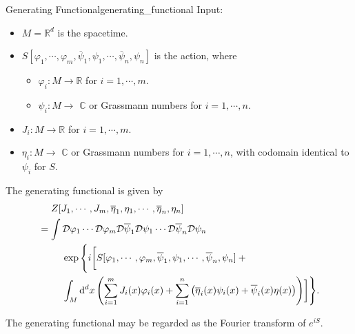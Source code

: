 \documentclass{article}
\begin{document}
\begin{definition}{Generating Functional}{generating_functional}
    Input:
    \begin{itemize}[nosep]
        \item $M = \mathbb{R}^{d}$ is the spacetime.
        \item $S[\varphi_1, \cdots, \varphi_m, \overline{\psi}_1,\psi_1,\cdots,\overline{\psi}_n,\psi_n]$ is the action, where
        \begin{itemize}[nosep]
            \item $\varphi_i: M \rightarrow \mathbb{R}$ for $i = 1,\cdots,m$.
            \item $\psi_i: M \rightarrow$ $\mathbb{C}$ or Grassmann numbers for $i = 1,\cdots, n$.
        \end{itemize}
        \item $J_i: M \rightarrow \mathbb{R}$ for $i = 1,\cdots,m$.
        \item $\eta_i: M \rightarrow$ $\mathbb{C}$ or Grassmann numbers for $i = 1,\cdots, n$, with codomain identical to $\psi_i$ for $S$.
    \end{itemize}
    The generating functional is given by
    \begin{align*}
        &\phantom{{}={}} Z[J_1, \cdots, J_m, \overline{\eta}_1,\eta_1,\cdots,\overline{\eta}_n,\eta_n] \\
        &= \int \mathcal{D}\varphi_1 \cdots \mathcal{D}\varphi_m \mathcal{D} \overline{\psi}_1 \mathcal{D}\psi_1 \cdots \mathcal{D}\overline{\psi}_n \mathcal{D}\psi_n \\
        &\phantom{{}={}\int} \exp\Bigg\{i\bigg[S[\varphi_1, \cdots, \varphi_m, \overline{\psi}_1,\psi_1,\cdots,\overline{\psi}_n,\psi_n] {}+{} \\
        &\phantom{{}={}\int }\int_M \dd{^d x} \qty(\sum_{i=1}^mJ_i(x)\varphi_i(x) + \sum_{i=1}^n \qty(\overline{\eta}_i(x)\psi_i(x) + \overline{\psi}_i(x)\eta(x))) \bigg]\Bigg\}.
    \end{align*}
\end{definition}

The generating functional may be regarded as the Fourier transform of $e^{iS}$.
\end{document}
